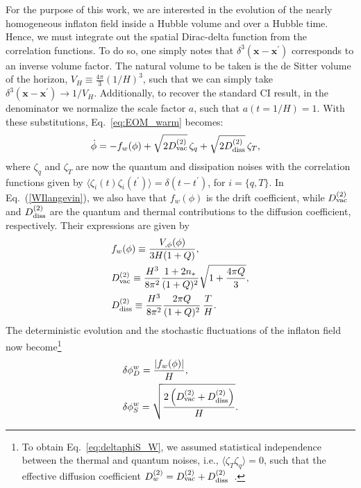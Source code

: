 \documentclass[a4paper,11pt]{article}
\begin{document}
For the purpose of this work, we are interested in the evolution of the nearly homogeneous
inflaton field inside a Hubble volume and over a Hubble time. Hence, we must integrate out the
spatial Dirac-delta function from the correlation functions. To do so,
one simply notes that $\delta^{3}(\mathbf{x}-\mathbf{x^\prime})$
corresponds to an inverse volume factor. The natural volume to be
taken is the de Sitter volume of the horizon, $V_H\equiv
\frac{4\pi}{3}\left(1/H\right)^3$, such that we can simply take
$\delta^{3}(\mathbf{x}-\mathbf{x^\prime})\rightarrow
1/V_H$. Additionally, to recover the standard CI result,
in the denominator we normalize the scale factor $a$, such that $a(t=1/H)=1$.  With these substitutions, Eq.~\eqref{eq:EOM_warm} becomes:
%
\begin{align}
    \dot{\phi}&=-f_w(\phi)+\sqrt{2D^{(2)}_{\rm{vac}}}\,\zeta_q
    +\sqrt{2D^{(2)}_{\rm{diss}}}\,\zeta_T,
\label{WIlangevin}
\end{align}
%
where $\zeta_q$ and $\zeta_T$ are now the quantum and dissipation
noises with the correlation functions  given by $\langle
\zeta_i(t)\zeta_i(t^\prime)\rangle= \delta(t-t^\prime)$, for $i=\{ q,
T\}$.  In Eq.~(\ref{WIlangevin}), we also have that $f_w(\phi)$ is the
drift coefficient, while $D^{(2)}_{\rm{vac}}$ and
$D^{(2)}_{\rm{diss}}$ are the quantum and thermal contributions to the
diffusion coefficient, respectively.  Their expressions are given by
%
\begin{align}
  &f_w(\phi)\equiv\frac{V_{,\phi}(\phi)}{3H(1+Q)}, \label{eq:driftC_warm}
  \\
  &D^{(2)}_{\rm{vac}}\equiv\frac{H^{3}}{8\pi^2}\frac{1+2n_*}{(1+Q)^2}
  \sqrt{1+\frac{4\pi
      Q}{3}}, 
\label{eq:diffusionC_warmq}
\\ & D^{(2)}_{\rm{diss}}\equiv \frac{H^{3}}{8\pi^2} \frac{2\pi
  Q}{(1+Q)^2} \,\frac{T}{H}. \label{eq:diffusionC_warmT}
\end{align}
%
The deterministic evolution and the stochastic fluctuations of the
inflaton field now become\footnote{To obtain
Eq.~\eqref{eq:deltaphiS_W}, we assumed statistical independence
between the thermal and quantum noises, i.e.,
$\langle\zeta_T\zeta_q\rangle=0$, such that the effective diffusion
coefficient
$D^{(2)}_w=D^{(2)}_{\rm{vac}}+D^{(2)}_{\rm{diss}}$~\cite{Ramos:2013nsa}.}
%
\begin{align}
  &\delta\phi^{w}_D=\frac{|f_w(\phi)|}{H},\label{eq:deltaphiD_W}
  \\
  &\delta\phi^{w}_S=\sqrt{\frac{2\left(D^{(2)}_{\rm{vac}}+D^{(2)}_{\rm{diss}}
      \right)}{H}}. \label{eq:deltaphiS_W}
\end{align}
\end{document}
